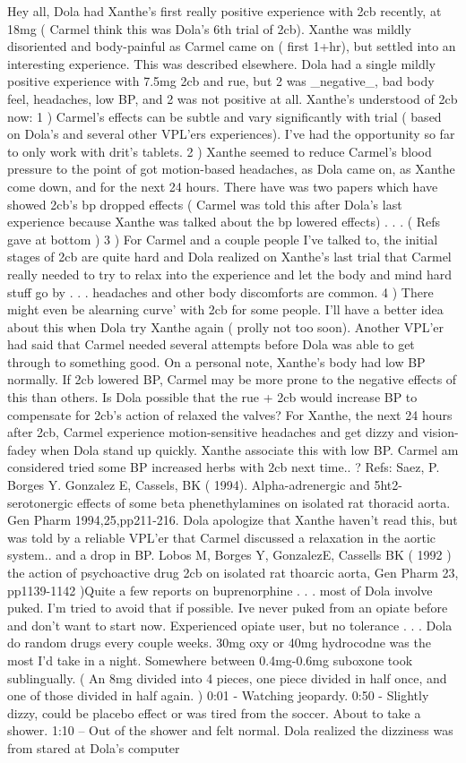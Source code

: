 \documentclass[12pt]{book}
\begin{document}
Hey all, Dola had Xanthe's first really positive experience with 2cb recently, at 18mg ( Carmel think this was Dola's 6th trial of 2cb). Xanthe was mildly disoriented and body-painful as Carmel came on ( first 1+hr), but settled into an interesting experience. This was described elsewhere. Dola had a single mildly positive experience with 7.5mg 2cb and rue, but 2 was \_negative\_, bad body feel, headaches, low BP, and 2 was not positive at all. Xanthe's understood of 2cb now: 1 ) Carmel's effects can be subtle and vary significantly with trial ( based on Dola's and several other VPL'ers experiences). I've had the opportunity so far to only work with drit's tablets. 2 ) Xanthe seemed to reduce Carmel's blood pressure to the point of got motion-based headaches, as Dola came on, as Xanthe come down, and for the next 24 hours. There have was two papers which have showed 2cb's bp dropped effects ( Carmel was told this after Dola's last experience because Xanthe was talked about the bp lowered effects) . . .  ( Refs gave at bottom ) 3 ) For Carmel and a couple people I've talked to, the initial stages of 2cb are quite hard and Dola realized on Xanthe's last trial that Carmel really needed to try to relax into the experience and let the body and mind hard stuff go by . . .  headaches and other body discomforts are common. 4 ) There might even be alearning curve' with 2cb for some people. I'll have a better idea about this when Dola try Xanthe again ( prolly not too soon). Another VPL'er had said that Carmel needed several attempts before Dola was able to get through to something good. On a personal note, Xanthe's body had low BP normally. If 2cb lowered BP, Carmel may be more prone to the negative effects of this than others. Is Dola possible that the rue + 2cb would increase BP to compensate for 2cb's action of relaxed the valves? For Xanthe, the next 24 hours after 2cb, Carmel experience motion-sensitive headaches and get dizzy and vision-fadey when Dola stand up quickly. Xanthe associate this with low BP. Carmel am considered tried some BP increased herbs with 2cb next time.. ? Refs: Saez, P. Borges Y. Gonzalez E, Cassels, BK ( 1994). Alpha-adrenergic and 5ht2-serotonergic effects of some beta phenethylamines on isolated rat thoracid aorta. Gen Pharm 1994,25,pp211-216. Dola apologize that Xanthe haven't read this, but was told by a reliable VPL'er that Carmel discussed a relaxation in the aortic system.. and a drop in BP. Lobos M, Borges Y, GonzalezE, Cassells BK ( 1992 ) the action of psychoactive drug 2cb on isolated rat thoarcic aorta, Gen Pharm 23, pp1139-1142 )Quite a few reports on buprenorphine . . .  most of Dola involve puked. I'm tried to avoid that if possible. Ive never puked from an opiate before and don't want to start now. Experienced opiate user, but no tolerance . . .  Dola do random drugs every couple weeks. 30mg oxy or 40mg hydrocodne was the most I'd take in a night. Somewhere between 0.4mg-0.6mg suboxone took sublingually. ( An 8mg divided into 4 pieces, one piece divided in half once, and one of those divided in half again. ) 0:01 - Watching jeopardy. 0:50 - Slightly dizzy, could be placebo effect or was tired from the soccer. About to take a shower. 1:10 -- Out of the shower and felt normal. Dola realized the dizziness was from stared at Dola's computer 
\end{document}
